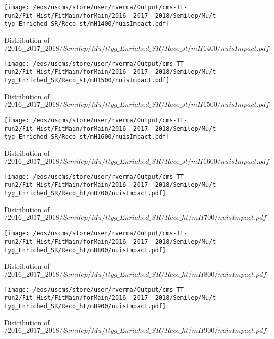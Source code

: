 \begin{figure}
\centering
\texttt{[image: /eos/uscms/store/user/rverma/Output/cms-TT-run2/Fit\_Hist/FitMain/forMain/2016\_\_2017\_\_2018/Semilep/Mu/ttyg\_Enriched\_SR/Reco\_st/mH1400/nuisImpact.pdf]}
\caption{Distribution of $/2016\_\_2017\_\_2018/Semilep/Mu/ttyg\_Enriched\_SR/Reco\_st/mH1400/nuisImpact.pdf$}
\end{figure}

\begin{figure}
\centering
\texttt{[image: /eos/uscms/store/user/rverma/Output/cms-TT-run2/Fit\_Hist/FitMain/forMain/2016\_\_2017\_\_2018/Semilep/Mu/ttyg\_Enriched\_SR/Reco\_st/mH1500/nuisImpact.pdf]}
\caption{Distribution of $/2016\_\_2017\_\_2018/Semilep/Mu/ttyg\_Enriched\_SR/Reco\_st/mH1500/nuisImpact.pdf$}
\end{figure}

\begin{figure}
\centering
\texttt{[image: /eos/uscms/store/user/rverma/Output/cms-TT-run2/Fit\_Hist/FitMain/forMain/2016\_\_2017\_\_2018/Semilep/Mu/ttyg\_Enriched\_SR/Reco\_st/mH1600/nuisImpact.pdf]}
\caption{Distribution of $/2016\_\_2017\_\_2018/Semilep/Mu/ttyg\_Enriched\_SR/Reco\_st/mH1600/nuisImpact.pdf$}
\end{figure}

\begin{figure}
\centering
\texttt{[image: /eos/uscms/store/user/rverma/Output/cms-TT-run2/Fit\_Hist/FitMain/forMain/2016\_\_2017\_\_2018/Semilep/Mu/ttyg\_Enriched\_SR/Reco\_ht/mH700/nuisImpact.pdf]}
\caption{Distribution of $/2016\_\_2017\_\_2018/Semilep/Mu/ttyg\_Enriched\_SR/Reco\_ht/mH700/nuisImpact.pdf$}
\end{figure}

\begin{figure}
\centering
\texttt{[image: /eos/uscms/store/user/rverma/Output/cms-TT-run2/Fit\_Hist/FitMain/forMain/2016\_\_2017\_\_2018/Semilep/Mu/ttyg\_Enriched\_SR/Reco\_ht/mH800/nuisImpact.pdf]}
\caption{Distribution of $/2016\_\_2017\_\_2018/Semilep/Mu/ttyg\_Enriched\_SR/Reco\_ht/mH800/nuisImpact.pdf$}
\end{figure}

\begin{figure}
\centering
\texttt{[image: /eos/uscms/store/user/rverma/Output/cms-TT-run2/Fit\_Hist/FitMain/forMain/2016\_\_2017\_\_2018/Semilep/Mu/ttyg\_Enriched\_SR/Reco\_ht/mH900/nuisImpact.pdf]}
\caption{Distribution of $/2016\_\_2017\_\_2018/Semilep/Mu/ttyg\_Enriched\_SR/Reco\_ht/mH900/nuisImpact.pdf$}
\end{figure}


